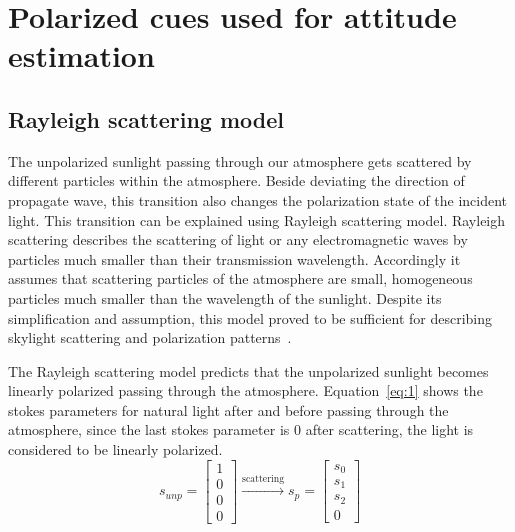 \graphicspath{{./content/intro/figures/}}

\section{Polarized cues used for attitude estimation}
\label{sec:pcues}


\subsection{Rayleigh scattering model}
\label{subsec:rayleigh}
The unpolarized sunlight passing through our atmosphere gets scattered by
different particles within the atmosphere.  Beside deviating the direction of
propagate wave, this transition also changes the polarization state of the
incident light. This transition can be explained using Rayleigh scattering
model.  Rayleigh scattering describes the scattering of light or any
electromagnetic waves by particles much smaller than their transmission
wavelength. Accordingly it assumes that scattering particles of the atmosphere
are small, homogeneous particles much smaller than the wavelength of the
sunlight.  Despite its simplification and assumption, this model proved to be
sufficient for describing skylight scattering and polarization
patterns~\cite{pomozi2001clearsky, horvath2002ground}.

The Rayleigh scattering model predicts that the unpolarized sunlight becomes
linearly polarized passing through the atmosphere.
Equation~\ref{eq:1} shows the stokes parameters for natural light after and
before passing through the atmosphere, since the last stokes parameter is $0$
after scattering, the light is considered to be linearly polarized.
\begin{equation}
  \label{eq:1}
  s_{unp} =
  \begin{bmatrix}
    1\\0\\0\\0
  \end{bmatrix}
  \xrightarrow[]{\text{scattering}}
  s_{p}=
  \begin{bmatrix}
   s_0 \\ s_1 \\ s_2 \\ 0
 \end{bmatrix}
\end{equation}

